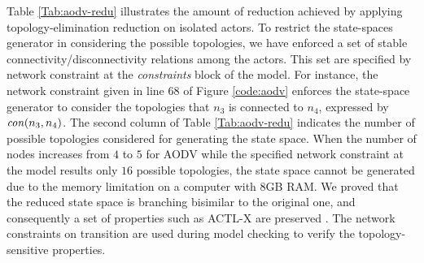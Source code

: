%
Table \ref{Tab:aodv-redu} illustrates the amount of reduction achieved by applying topology-elimination reduction on isolated actors. To restrict the state-spaces generator in considering the possible topologies, we have enforced a set of stable connectivity/disconnectivity relations among the actors. This set are specified by network constraint at the \emph{constraints} block of the model. For instance, the network constraint given in line $68$ of Figure \ref{code:aodv} enforces the state-space generator to consider the topologies that $n_3$ is connected to $n_4$, expressed by ${\it con}(n_3,n_4)$. The second column of Table \ref{Tab:aodv-redu} indicates the number of possible topologies considered for generating the state space. When the number of nodes increases from $4$ to $5$ for AODV while the specified network constraint at the model results only $16$ possible topologies, the state space cannot be generated due to the memory limitation on a computer with $8${GB} {RAM}.  We proved that the reduced state space is branching bisimilar to the
original one, and consequently a set of properties such as {ACTL-X} are preserved \cite{FOAC}. The network constraints on transition are used during model checking \cite{FORM,CSI2018} to verify the topology-sensitive properties. 

